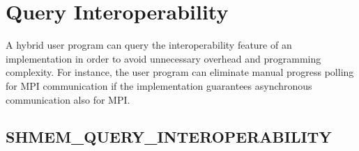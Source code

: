 

\section{Query Interoperability}

A hybrid user program can query the interoperability feature of an \openshmem
implementation in order to avoid unnecessary overhead and programming complexity.
For instance, the user program can eliminate manual progress polling for MPI
communication if the \openshmem implementation guarantees asynchronous
communication also for MPI.

\subsection{\textbf{SHMEM\_QUERY\_INTEROPERABILITY}}
\label{subsec:interoperability:query}
